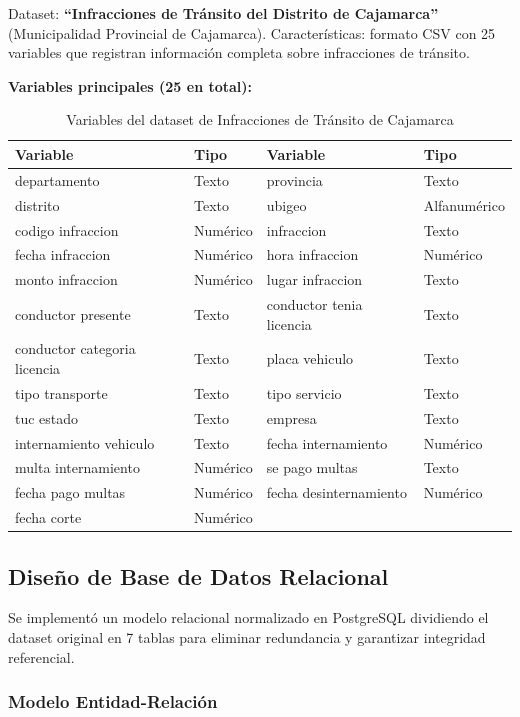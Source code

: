 \documentclass[12pt,a4paper]{article}
\begin{document}
Dataset: \textbf{``Infracciones de Tránsito del Distrito de Cajamarca''} (Municipalidad Provincial de Cajamarca). Características: formato CSV con 25 variables que registran información completa sobre infracciones de tránsito.

\textbf{Variables principales (25 en total):}

\begin{table}[H]
\centering
\small
\begin{tabular}{lll}
\toprule
\textbf{Variable} & \textbf{Tipo} & \quad \textbf{Variable} & \textbf{Tipo} \\
\midrule
departamento & Texto & provincia & Texto \\
distrito & Texto & ubigeo & Alfanumérico \\
codigo infraccion & Numérico & infraccion & Texto \\
fecha infraccion & Numérico & hora infraccion & Numérico \\
monto infraccion & Numérico & lugar infraccion & Texto \\
conductor presente & Texto & conductor tenia licencia & Texto \\
conductor categoria licencia & Texto & placa vehiculo & Texto \\
tipo transporte & Texto & tipo servicio & Texto \\
tuc estado & Texto & empresa & Texto \\
internamiento vehiculo & Texto & fecha internamiento & Numérico \\
multa internamiento & Numérico & se pago multas & Texto \\
fecha pago multas & Numérico & fecha desinternamiento & Numérico \\
fecha corte & Numérico & & \\
\bottomrule
\end{tabular}
\caption{Variables del dataset de Infracciones de Tránsito de Cajamarca}
\label{tab:variables}
\end{table}

\subsection{Diseño de Base de Datos Relacional}

Se implementó un modelo relacional normalizado en PostgreSQL dividiendo el dataset original en 7 tablas para eliminar redundancia y garantizar integridad referencial.

\subsubsection{Modelo Entidad-Relación}
\end{document}
